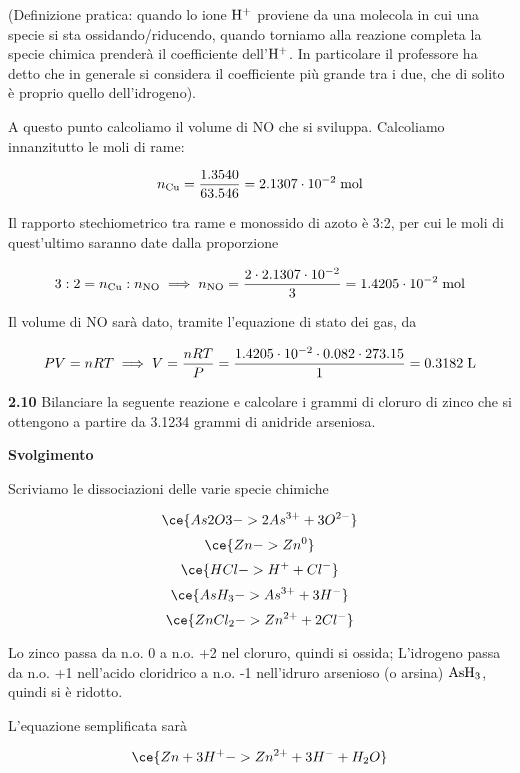 (Definizione pratica: quando lo ione $\rm H^+$ proviene da una molecola in cui una specie si sta ossidando/riducendo, quando torniamo alla reazione completa la specie chimica prenderà il coefficiente dell'$\rm H^+$. In particolare il professore ha detto che in generale si considera il coefficiente più grande tra i due, che di solito è proprio quello dell'idrogeno).

\vspace{0.2cm}A questo punto calcoliamo il volume di NO che si sviluppa. Calcoliamo innanzitutto le moli di rame:

$$n_{\rm Cu}=\frac{1.3540}{63.546}=2.1307 \cdot 10^{-2} \; \rm mol$$

Il rapporto stechiometrico tra rame e monossido di azoto è 3:2, per cui le moli di quest'ultimo saranno date dalla proporzione

$$3:2=n_{\rm Cu}:n_{\rm NO}
\implies
n_{\rm NO}=\frac{2 \cdot 2.1307 \cdot 10^{-2}}{3}=1.4205 \cdot 10^{-2} \; \rm mol$$

Il volume di NO sarà dato, tramite l'equazione di stato dei gas, da

$$PV=nRT
\implies
V=\frac{nRT}{P}=\frac{1.4205 \cdot 10^{-2} \cdot 0.082 \cdot 273.15}{1}=0.3182 \; \rm L$$

\newpage

\vspace{0.2cm}\textbf{2.10} Bilanciare la seguente reazione e calcolare i grammi di cloruro di zinco che si ottengono a partire da 3.1234 grammi di anidride arseniosa.

\begin{center}
\end{center}

\large\textbf{Svolgimento}\normalsize

\vspace{0.2cm}Scriviamo le dissociazioni delle varie specie chimiche

$$\ce{As2O3 -> 2As^{3+} + 3O^{2-}}$$
$$\ce{Zn -> Zn^0}$$
$$\ce{HCl -> H^+ + Cl^-}$$
$$\ce{AsH_3 -> As^{3+} + 3H^{-}}$$
$$\ce{ZnCl_2 -> Zn^{2+} + 2Cl^{-}}$$

Lo zinco passa da n.o. 0 a n.o. +2 nel cloruro, quindi si ossida; L'idrogeno passa da n.o. +1 nell'acido cloridrico a n.o. -1 nell'idruro arsenioso (o arsina) $\rm AsH_3$, quindi si è ridotto.

L'equazione semplificata sarà

$$\ce{Zn + 3H^+ -> Zn^{2+} + 3H^- + H_2O }$$

